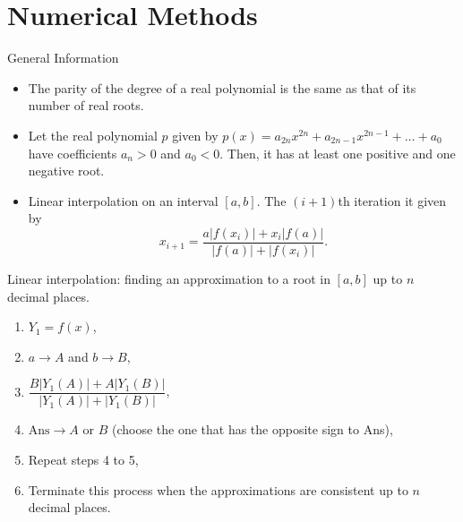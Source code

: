 \documentclass[../Notes.tex]{subfiles}
\begin{document}
    \chapter{Numerical Methods}
    \begin{stbox}{General Information}
        \begin{itemize}
            \item The parity of the degree of a real polynomial is the same as that of its number of real roots.
            \item Let the real polynomial \(p\) given by \(p(x)=a_{2n}x^{2n}+a_{2n-1}x^{2n-1}+\dots+a_0\) have coefficients \(a_n>0\) and \(a_0<0\). Then, it has at least one positive and one negative root.
            \item Linear interpolation on an interval \([a,b]\). The \((i+1)\)th iteration it given by
            \[x_{i+1}=\frac{a \lvert f(x_i) \rvert+x_i \lvert f(a) \rvert}{\lvert f(a) \rvert+\lvert f(x_i) \rvert}.\]
        \end{itemize}
    \end{stbox}
    \begin{GCSkills}{}
        Linear interpolation: finding an approximation to a root in \([a,b]\) up to \(n\) decimal places.
        \begin{enumerate}
          \item \(Y_1=f(x)\),
          \item \(a \to A\) and \(b \to B\),
          \item \(\dfrac{B \lvert Y_1(A) \rvert+A \lvert Y_1(B) \rvert}{\lvert Y_1(A) \rvert+\lvert Y_1(B) \rvert}\),
          \item \(\text{Ans}\to A \text{ or } B\) (choose the one that has the opposite sign to Ans),
          \item Repeat steps 4 to 5,
          \item Terminate this process when the approximations are consistent up to \(n\) decimal places.
        \end{enumerate}
      \end{GCSkills}
\end{document}
